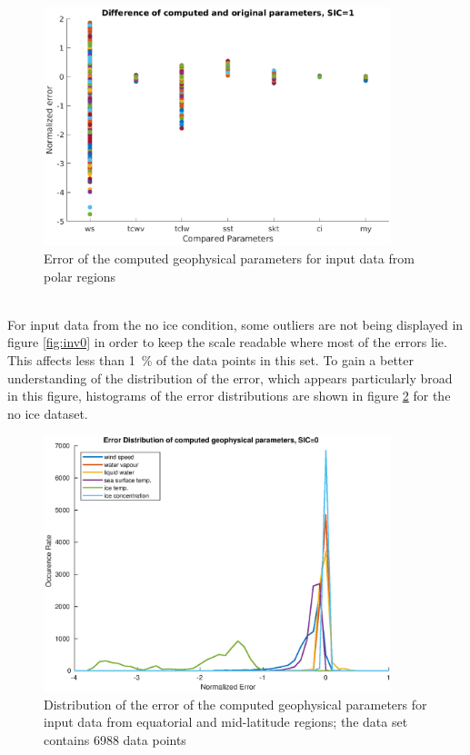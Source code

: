 \documentclass[11pt, a4paper]{article}
\begin{document}
\begin{figure}[h]
   \centering
   \includegraphics[width=0.9\textwidth]{ValidationInverse_SIC1.eps}
   \caption{Error of the computed geophysical parameters for input data from polar regions}
   \label{fig:inv1}
\end{figure}

\ \\
For input data from the no ice condition, some outliers are not being displayed in figure \ref{fig:inv0} in order to keep the scale readable where most of the errors lie. This affects less than \SI{1}{\percent} of the data points in this set. To gain a better understanding of the distribution of the error, which appears particularly broad in this figure, histograms of the error distributions are shown in figure \mbox{\ref{fig:inv1dist}} for the no ice dataset.

\begin{figure}[h]
   \centering
   \includegraphics[width=0.9\textwidth]{ValidationInverse_SIC0_errordist.eps}
   \caption{Distribution of the error of the computed geophysical parameters for input data from equatorial and mid-latitude regions; the data set contains 6988 data points}
   \label{fig:inv1dist}
\end{figure}
\end{document}
